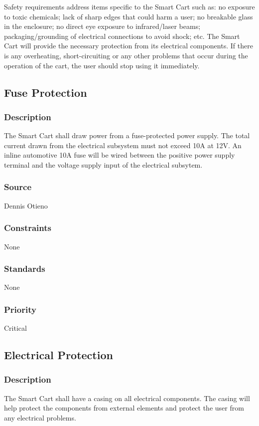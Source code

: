 Safety requirements address items specific to the Smart Cart such as: no exposure to toxic chemicals; lack of sharp edges that could harm a user; no breakable glass in the enclosure; no direct eye exposure to infrared/laser beams; packaging/grounding of electrical connections to avoid shock; etc. The Smart Cart will provide the necessary protection from its electrical components. If there is any overheating, short-circuiting or any other problems that occur during the operation of the cart, the user should stop using it immediately. 

\subsection{Fuse Protection}
\subsubsection{Description}
The Smart Cart shall draw power from a fuse-protected power supply. The total current drawn from the electrical subsystem must not exceed 10A at 12V. An inline automotive 10A fuse will be wired between the positive power supply terminal and the voltage supply input of the electrical subsytem.
\subsubsection{Source}
Dennis Otieno
\subsubsection{Constraints}
None
\subsubsection{Standards}
None
\subsubsection{Priority}
Critical

\subsection{Electrical Protection}
\subsubsection{Description}
The Smart Cart shall have a casing on all electrical components. The casing will help protect the components from external elements and protect the user from any electrical problems.
